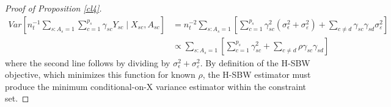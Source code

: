 \begin{proof}[Proof of Proposition \ref{cl4}]
\begin{align*}
    Var[n_t^{-1}\sum_{s: A_s = 1}\sum_{c = 1}^{p_s}\gamma_{sc}Y_{sc} \mid X_{sc}, A_{sc}] &= n_t^{-2}\sum_{s: A_s = 1}[\sum_{c = 1}^{p_s}\gamma_{sc}^2(\sigma^2_{\epsilon} + \sigma^2_{\varepsilon}) + \sum_{c \ne d}\gamma_{sc}\gamma_{sd}\sigma^2_{\varepsilon}] \\
    &\propto \sum_{s: A_s = 1}[\sum_{c = 1}^{p_s}\gamma_{sc}^2 + \sum_{c \ne d}\rho \gamma_{sc}\gamma_{sd}]
\end{align*}
%
where the second line follows by dividing by $\sigma^2_{\epsilon} + \sigma^2_{\varepsilon}$. By definition of the H-SBW objective, which minimizes this function for known $\rho$, the H-SBW estimator must produce the minimum conditional-on-X variance estimator within the constraint set.
\end{proof}

